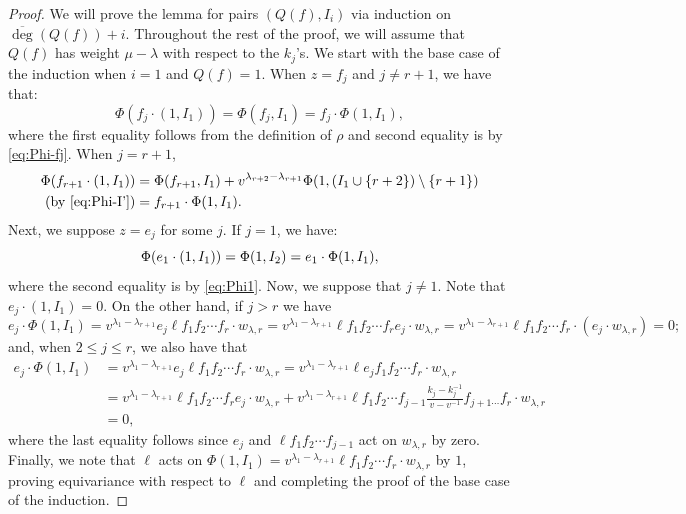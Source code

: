 \documentclass[10pt,a4paper]{amsart}
\newcommand{\ol}{\overline}
\newcommand{\sm}{\setminus}
\begin{document}
\begin{proof}
We will prove the lemma for pairs $(Q(f), I_i)$ via induction on $\ol\deg(Q(f))+i$. Throughout the rest of the proof, we will assume that $Q(f)$ has weight $\mu-\lambda$ with respect to the $k_j$'s. We start with the base case of the induction when $i=1$ and $Q(f)=1$. When $z=f_j$ and $j\neq r+1$, we have that:
\begin{equation}\label{eq:fj-11}\Phi(f_j\cdot (1, I_1)) = \Phi(f_j, I_1) = f_j\cdot \Phi(1,I_{1}),\end{equation}
where the first equality follows from the definition of $\rho$ and second equality is by \eqref{eq:Phi-fj}. %
When $j=r+1$, 
\begin{align}
\notag\Phi(f_{r+1}\cdot (1, I_1)) &= \Phi(f_{r+1}, I_1) + v^{\lambda_{r+2}-\lambda_{r+1}}\Phi(1,(I_1\cup\{r+2\})\sm\{r+1\})\\
\label{eq:fr-11}\text{(by \eqref{eq:Phi-I'})}&= f_{r+1}\cdot \Phi(1,I_{1}).
\end{align}
Next, we suppose $z=e_j$ for some $j$. If $j=1$, we have:
\[\Phi(e_1\cdot (1,I_1))  = \Phi(1,I_2)\\
 = e_1\cdot \Phi(1,I_1),\]
where the second equality is by \eqref{eq:Phi1}. Now, we suppose that $j\neq 1$. Note that $e_j\cdot (1,I_1)=0$. On the other hand, if $j>r$ we have
\[e_j\cdot\Phi(1,I_1)= v^{\lambda_1-\lambda_{r+1}}e_j\ell f_1f_2\cdots f_r\cdot w_{\lambda,r}=v^{\lambda_1-\lambda_{r+1}}\ell f_1f_2\cdots f_re_j\cdot w_{\lambda,r}=v^{\lambda_1-\lambda_{r+1}}\ell f_1f_2\cdots f_r\cdot( e_j\cdot w_{\lambda,r})=0;\]
and, when $2\leq j\leq r$, we also have that
\begin{align*}
e_j\cdot\Phi(1,I_1)&= v^{\lambda_1-\lambda_{r+1}}e_j\ell f_1f_2\cdots f_r\cdot w_{\lambda,r}=v^{\lambda_1-\lambda_{r+1}}\ell e_j f_1f_2\cdots f_r\cdot w_{\lambda,r}\\
&=v^{\lambda_1-\lambda_{r+1}}\ell f_1f_2\cdots f_re_j\cdot w_{\lambda,r} + v^{\lambda_1-\lambda_{r+1}}\ell f_1f_2\cdots f_{j-1}\frac{k_j-k_j^{-1}}{v-v^{-1}}f_{j+1\cdots}f_r\cdot w_{\lambda,r}\\
&=0,
\end{align*}
where the last equality follows since $e_j$ and $\ell f_1f_2\cdots f_{j-1}$ act on $w_{\lambda, r}$ by zero. Finally, we note that $\ell$ acts on $\Phi(1,I_1) = v^{\lambda_1-\lambda_{r+1}}\ell f_1f_2\cdots f_r \cdot w_{\lambda, r}$ by $1$, proving equivariance with respect to $\ell$ and completing the proof of the base case of the induction.


\end{proof}
\end{document}
